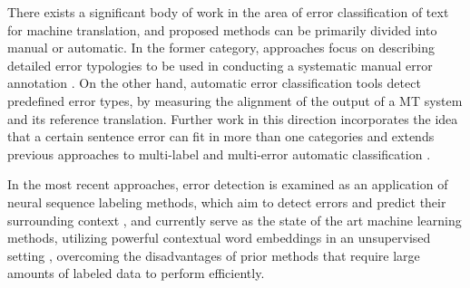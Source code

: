 
There exists a significant body of work in the area of error classification of text for machine translation, and proposed methods can be primarily divided into manual or automatic. In the former category, approaches focus on describing detailed error typologies to be used in conducting a systematic manual error annotation \cite{fishel2011automatic,vilar2006error, lommel2014multidimensional, farrus2010linguistic, costa2015linguistically}. On the other hand,  automatic error classification tools \cite{zeman2011addicter, popovic2011hjerson,popovic2015poor} detect predefined error types, by measuring the alignment of the output of a MT system and its reference translation. Further work in this direction incorporates the idea that a certain sentence error can fit in more than one categories \cite{klubivcka2018quantitative, lommel2014assessing} and extends previous approaches to multi-label and multi-error automatic classification \cite{popovic2019automatic}. 

In the most recent approaches, error detection is examined as an application of neural sequence labeling methods, which aim to detect errors and predict their surrounding context \cite{rei2017semi}, and currently serve as the state of the art machine learning methods, utilizing powerful contextual word embeddings in an unsupervised setting \cite{bell2019context}, overcoming the disadvantages of prior methods that require large amounts of labeled data to perform efficiently.